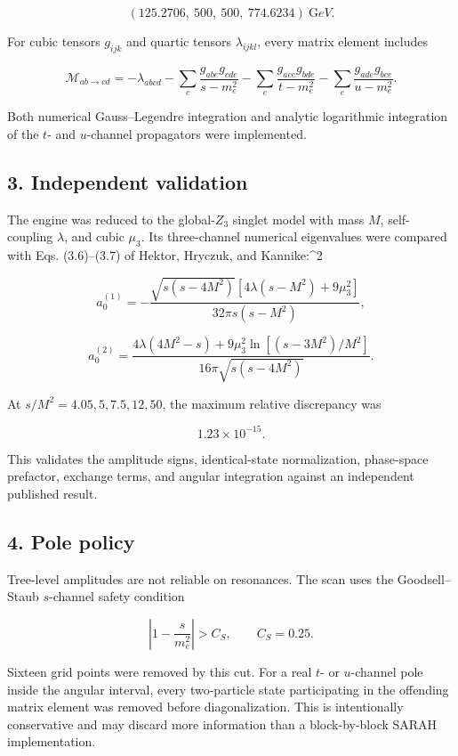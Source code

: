 \documentclass[
]{article}
\begin{document}
\[
(125.2706,\ 500,\ 500,\ 774.6234)\ {\mathrm GeV}.
\]

For cubic tensors \(g_{ijk}\) and quartic tensors \(\lambda_{ijkl}\),
every matrix element includes

\[
\mathcal M_{ab\to cd}=
-\lambda_{abcd}
-\sum_e\frac{g_{abe}g_{cde}}{s-m_e^2}
-\sum_e\frac{g_{ace}g_{bde}}{t-m_e^2}
-\sum_e\frac{g_{ade}g_{bce}}{u-m_e^2}.
\]

Both numerical Gauss--Legendre integration and analytic logarithmic
integration of the \(t\)- and \(u\)-channel propagators were
implemented.

\hypertarget{independent-validation}{%
\subsection{3. Independent validation}\label{independent-validation}}

The engine was reduced to the global-\(Z_3\) singlet model with mass
\(M\), self-coupling \(\lambda\), and cubic \(\mu_3\). Its three-channel
numerical eigenvalues were compared with Eqs. (3.6)--(3.7) of Hektor,
Hryczuk, and Kannike:\^{}2

\[
a_0^{(1)}=
-\frac{\sqrt{s(s-4M^2)}
\left[4\lambda(s-M^2)+9\mu_3^2\right]}
{32\pi s(s-M^2)},
\]

\[
a_0^{(2)}=
\frac{4\lambda(4M^2-s)+9\mu_3^2
\ln[(s-3M^2)/M^2]}
{16\pi\sqrt{s(s-4M^2)}}.
\]

At \(s/M^2=4.05,5,7.5,12,50\), the maximum relative discrepancy was

\[
1.23\times10^{-15}.
\]

This validates the amplitude signs, identical-state normalization,
phase-space prefactor, exchange terms, and angular integration against
an independent published result.

\hypertarget{pole-policy}{%
\subsection{4. Pole policy}\label{pole-policy}}

Tree-level amplitudes are not reliable on resonances. The scan uses the
Goodsell--Staub \(s\)-channel safety condition

\[
\left|1-\frac{s}{m_e^2}\right|>C_S,
\qquad C_S=0.25.
\]

Sixteen grid points were removed by this cut. For a real \(t\)- or
\(u\)-channel pole inside the angular interval, every two-particle state
participating in the offending matrix element was removed before
diagonalization. This is intentionally conservative and may discard more
information than a block-by-block SARAH implementation.
\end{document}
